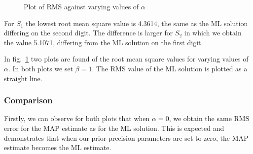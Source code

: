 \documentclass{article}
\begin{document}
\begin{figure}
\caption{Plot of RMS against varying values of $\alpha$}
\label{fig:rmsalpha}
\end{figure}

For $S_1$ the lowest root mean square value is 4.3614, the same as the
ML solution differing on the second digit. The difference is larger
for $S_2$ in which we obtain the value 5.1071, differing from the ML
solution on the first digit.

In fig.~\ref{fig:rmsalpha} two plots are found of the root mean square
values for varying values of $\alpha$. In both plots we set $\beta =
1$. The RMS value of the ML solution is plotted as a straight line.


\subsubsection{Comparison}

Firstly, we can observe for both plots that when $\alpha = 0$, we
obtain the same $\mathrm{RMS}$ error for the MAP estimate as for the
ML solution. This is expected and demonstrates that when our prior
precision parameters are set to zero, the MAP estimate becomes the ML
estimate.
\end{document}

